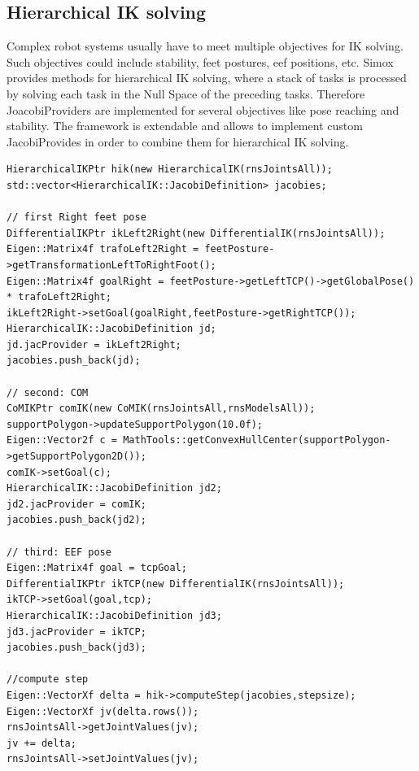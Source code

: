 \documentclass{book}
\begin{document}
\subsection{Hierarchical IK solving}
Complex robot systems usually have to meet multiple objectives for IK solving. Such objectives could include stability, feet postures, eef positions, etc. Simox provides methods for hierarchical IK solving, where a stack of tasks is processed by solving each task in the Null Space of the preceding tasks. Therefore JoacobiProviders are implemented for several objectives like pose reaching and stability. The framework is extendable and allows to implement custom JacobiProvides in order to combine them for hierarchical IK solving.
\begin{lstlisting}
HierarchicalIKPtr hik(new HierarchicalIK(rnsJointsAll));
std::vector<HierarchicalIK::JacobiDefinition> jacobies;

// first Right feet pose
DifferentialIKPtr ikLeft2Right(new DifferentialIK(rnsJointsAll));
Eigen::Matrix4f trafoLeft2Right = feetPosture->getTransformationLeftToRightFoot();
Eigen::Matrix4f goalRight = feetPosture->getLeftTCP()->getGlobalPose() * trafoLeft2Right;
ikLeft2Right->setGoal(goalRight,feetPosture->getRightTCP());
HierarchicalIK::JacobiDefinition jd;
jd.jacProvider = ikLeft2Right;
jacobies.push_back(jd);

// second: COM
CoMIKPtr comIK(new CoMIK(rnsJointsAll,rnsModelsAll));
supportPolygon->updateSupportPolygon(10.0f);
Eigen::Vector2f c = MathTools::getConvexHullCenter(supportPolygon->getSupportPolygon2D());
comIK->setGoal(c); 
HierarchicalIK::JacobiDefinition jd2;
jd2.jacProvider = comIK;
jacobies.push_back(jd2);

// third: EEF pose
Eigen::Matrix4f goal = tcpGoal;
DifferentialIKPtr ikTCP(new DifferentialIK(rnsJointsAll));
ikTCP->setGoal(goal,tcp);
HierarchicalIK::JacobiDefinition jd3;
jd3.jacProvider = ikTCP;
jacobies.push_back(jd3);

//compute step
Eigen::VectorXf delta = hik->computeStep(jacobies,stepsize);
Eigen::VectorXf jv(delta.rows());
rnsJointsAll->getJointValues(jv);
jv += delta;
rnsJointsAll->setJointValues(jv);
\end{lstlisting}
\end{document}
